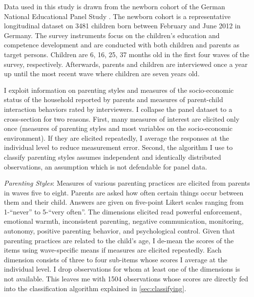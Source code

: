 Data used in this study is drawn from the newborn cohort of the German National Educational Panel Study \parencite{nepsnationaleducationalpanelstudybamberggermanyNEPSStartingCohort2021}. The newborn cohort is a representative longitudinal dataset on 3481 children born between February and June 2012 in Germany. The survey instruments focus on the children's education and competence development and are conducted with both children and parents as target persons. Children are 6, 16, 25, 37 months old in the first four waves of the survey, respectively. Afterwards, parents and children are interviewed once a year up until the most recent wave where children are seven years old. 

I exploit information on parenting styles and measures of the socio-economic status of the household reported by parents and measures of parent-child interaction behaviors rated by interviewers. I collapse the panel dataset to a cross-section for two reasons. First, many measures of interest are elicited only once (measures of parenting styles and most variables on the socio-economic environment). If they are elicited repeatedly, I average the responses at the individual level to reduce measurement error. Second, the algorithm I use to classify parenting styles assumes independent and identically distributed observations, an assumption which is not defendable for panel data.

\textit{Parenting Styles}: Measures of various parenting practices are elicited from parents in waves five to eight. Parents are asked how often certain things occur between them and their child. Answers are given on five-point Likert scales ranging from 1-``never'' to 5-``very often''. The dimensions elicited read powerful enforcement, emotional warmth, inconsistent parenting, negative communication, monitoring, autonomy, positive parenting behavior, and psychological control. Given that parenting practices are related to the child's age, I de-mean the scores of the items using wave-specific means if measures are elicited repeatedly. Each dimension consists of three to four sub-items whose scores I average at the individual level. I drop observations for whom at least one of the dimensions is not available. This leaves me with 1504 observations whose scores are directly fed into the classification algorithm explained in \ref{sec:classifying}.

